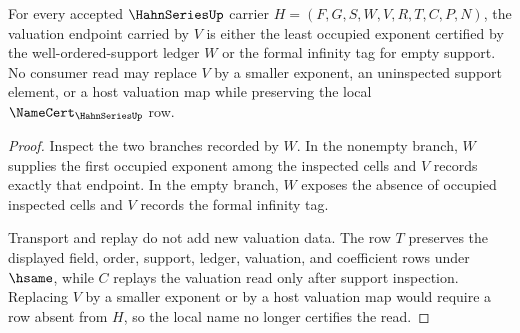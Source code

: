 \begin{theorem}
\label{thm:hahn-series-valuation-nonescape}
For every accepted $\HahnSeriesUp$ carrier $H=(F,G,S,W,V,R,T,C,P,N)$, the valuation endpoint carried by $V$ is either the least occupied exponent certified by the well-ordered-support ledger $W$ or the formal infinity tag for empty support. No consumer read may replace $V$ by a smaller exponent, an uninspected support element, or a host valuation map while preserving the local $\NameCert_{\HahnSeriesUp}$ row.
\end{theorem}
\begin{proof}
Inspect the two branches recorded by $W$. In the nonempty branch, $W$ supplies the first occupied exponent among the inspected cells and $V$ records exactly that endpoint. In the empty branch, $W$ exposes the absence of occupied inspected cells and $V$ records the formal infinity tag.

Transport and replay do not add new valuation data. The row $T$ preserves the displayed field, order, support, ledger, valuation, and coefficient rows under $\hsame$, while $C$ replays the valuation read only after support inspection. Replacing $V$ by a smaller exponent or by a host valuation map would require a row absent from $H$, so the local name no longer certifies the read.
\end{proof}




